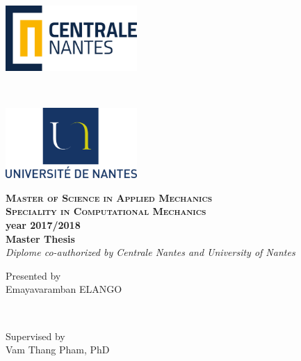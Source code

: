 \documentclass[12pt,twoside]{report}
\begin{document}








\begin{titlepage}
\begin{minipage}{0.45\textwidth}
\begin{flushleft} 
\includegraphics[width = 50mm]{images/ECN.png}
\end{flushleft}
\end{minipage}
~
\begin{minipage}{0.45\textwidth}
\begin{flushright} 
\includegraphics[width = 50mm]{images/Uni-logo.png}
\end{flushright}
\end{minipage}
\begin{center}
\vspace{2.5mm}
\textsc{\large{\textbf{Master of Science in Applied Mechanics\\ Speciality in Computational Mechanics}}}
\\
\vspace{20mm}
{\large{\textbf{year 2017/2018}}}\\
\vspace{10mm}
{\large{\textbf{Master Thesis}}}\\
\vspace{10mm}
\large{\textit{Diplome co-authorized by
Centrale Nantes and University of Nantes}}\\
\vspace{10mm}
\begin{minipage}{0.45\textwidth}
\begin{center}
\large{Presented by}\\
\vspace{2mm}
Emayavaramban ELANGO \\
\end{center} 
\end{minipage}
~
\begin{minipage}{0.45\textwidth}
\begin{center}
\large{Supervised by}\\
\vspace{2mm}
Vam Thang Pham, PhD \\
\end{center}
\end{minipage}


\end{center}
\end{titlepage}
\end{document}
